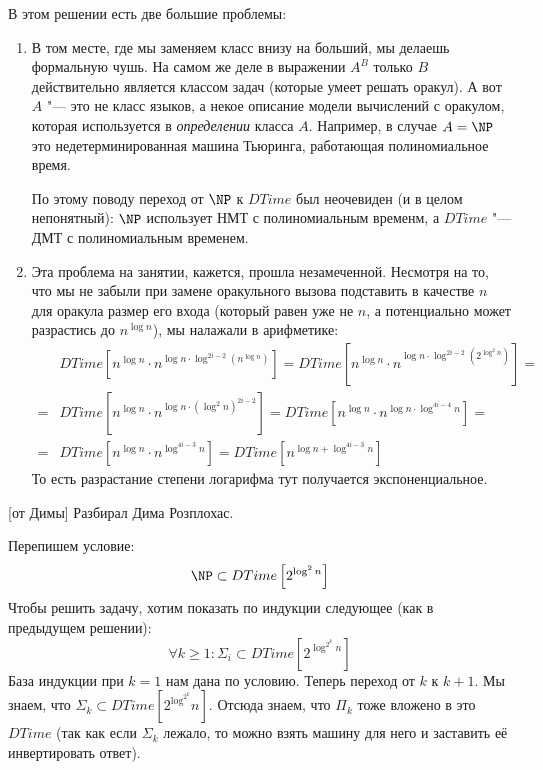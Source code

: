 	В этом решении есть две большие проблемы:
	\begin{enumerate}
	\item
		В том месте, где мы заменяем класс внизу на больший, мы делаешь формальную чушь.
		На самом же деле в выражении $A^B$ только $B$ действительно является классом задач
		(которые умеет решать оракул).
		А вот $A$ "--- это не класс языков, а некое описание модели вычислений с оракулом,
		которая используется в \textit{определении} класса $A$.
		Например, в случае $A=\NP$ это недетерминированная машина Тьюринга, работающая полиномиальное время.

		По этому поводу переход от $\NP$ к $DTime$ был неочевиден (и в целом непонятный): $\NP$
		использует НМТ с полиномиальным временм, а $DTime$ "--- ДМТ с полиномиальным временем.
	\item
		Эта проблема на занятии, кажется, прошла незамеченной.
		Несмотря на то, что мы не забыли при замене оракульного вызова подставить в качестве $n$ для оракула
		размер его входа (который равен уже не $n$, а потенциально может разрастись до $n^{\log n}$), мы налажали в арифметике:
		\begin{align*}
			  &DTime[n^{\log n} \cdot n^{\log n \cdot \log^{2i-2} \left( n^{\log n} \right)}] =
			   DTime[n^{\log n} \cdot n^{\log n \cdot \log^{2i-2} \left( 2^{\log^2 n} \right)}] = \\
			= &DTime[n^{\log n} \cdot n^{\log n \cdot \left(\log^2 n\right)^{2i-2}}] =
			   DTime[n^{\log n} \cdot n^{\log n \cdot \log^{4i-4} n}] = \\
			= &DTime[n^{\log n} \cdot n^{\log^{4i-3} n}] =
			   DTime[n^{\log n + \log^{4i-3} n}]
		\end{align*}
		То есть разрастание степени логарифма тут получается экспоненциальное.
	\end{enumerate}

[от Димы]
	Разбирал Дима Розплохас.

	Перепишем условие:
	\[ \NP \subset DTime\left[2^{\log^2 n}\right] \]
	Чтобы решить задачу, хотим показать по индукции следующее (как в предыдущем решении):
	\[ \forall k \ge 1 \colon \Sigma_i \subset DTime\left[2^{\log^{2^k} n}\right] \]
	База индукции при $k=1$ нам дана по условию.
	Теперь переход от $k$ к $k+1$.
	Мы знаем, что $\Sigma_k \subset DTime\left[2^{\log^{2^k}} n\right]$.
	Отсюда знаем, что $\Pi_k$ тоже вложено в это $DTime$
	(так как если $\Sigma_k$ лежало, то можно взять машину для него и заставить её инвертировать ответ).

